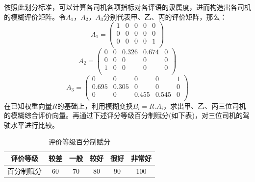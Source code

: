 \documentclass[bwprint]{cumcmthesis}
\begin{document}
            依照此划分标准，可以计算各司机各项指标对各评语的隶属度，进而构造出各司机的模糊评价矩阵。令$A_1$，$A_2$，$A_3$分别代表甲、乙、丙的评价矩阵，那么：
            \[
                A_1 = 
                \begin{pmatrix}
                    1 & 0 & 0 & 0 & 0  \\
                    0 & 0 & 0 & 0 & 0  \\
                    0 & 0 & 0 & 0 & 1  \\
                \end{pmatrix}
            \]
            \[    
                A_2 = 
                \begin{pmatrix}
                    0 & 0 & 0.326 & 0.674 & 0  \\
                    0 & 0 & 0 & 0 & 0  \\
                    1 & 0 & 0 & 0 & 0  \\
                \end{pmatrix}
            \]
            \[
                A_3 = 
                \begin{pmatrix}
                    0 & 0 & 0 & 0 & 1  \\
                    0.695 & 0.305 & 0 & 0 & 0  \\
                    0 & 0 & 0.455 & 0.545 & 0  \\
                \end{pmatrix}
            \]
            在已知权重向量$R$的基础上，利用模糊变换$B_i=R.A_i$，求出甲、乙、丙三位司机的模糊综合评价向量。再通过下述评分等级百分制赋分(如下表)，对三位司机的驾驶水平进行比较。
            \begin{table}[htbp]
                \centering
                \caption{评价等级百分制赋分}
                    \begin{tabular}{|c|c|c|c|c|c|}
                    \hline
                    评价等级  & 较差    & 一般    & 较好    & 很好    & 非常好 \\
                    \hline
                    百分制赋分 & 60    & 70    & 80    & 90    & 100 \\
                    \hline
                    \end{tabular}
                \label{tab:ten}
            \end{table}
            
\end{document}
